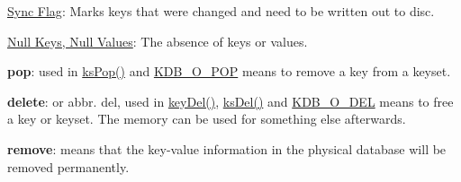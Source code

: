 \begin{DoxyItemize}
\item \hyperlink{doc_help_elektra-sync-flag_md}{Sync Flag}\+: Marks keys that were changed and need to be written out to disc.
\item \hyperlink{md_doc_help_elektra-values_doc_help_elektra-values_md}{Null Keys, Null Values}\+: The absence of keys or values.
\item {\bfseries pop}\+: used in {\ttfamily \hyperlink{group__keyset_gae42530b04defb772059de0600159cf69}{ks\+Pop()}} and \hyperlink{group__keyset_gga98a3d6a4016c9dad9cbd1a99a9c2a45aa52fb5f2cc86773d393da62bebebf7984}{K\+D\+B\+\_\+\+O\+\_\+\+P\+OP} means to remove a key from a keyset.
\item {\bfseries delete}\+: or abbr. del, used in {\ttfamily \hyperlink{group__key_ga3df95bbc2494e3e6703ece5639be5bb1}{key\+Del()}}, {\ttfamily \hyperlink{group__keyset_ga27e5c16473b02a422238c8d970db7ac8}{ks\+Del()}} and \hyperlink{group__keyset_gga98a3d6a4016c9dad9cbd1a99a9c2a45aa66a5380c120f25f28f49848c4a863ead}{K\+D\+B\+\_\+\+O\+\_\+\+D\+EL} means to free a key or keyset. The memory can be used for something else afterwards.
\item {\bfseries remove}\+: means that the key-\/value information in the physical database will be removed permanently. 
\end{DoxyItemize}